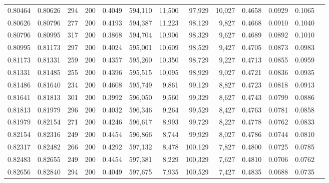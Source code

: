 \begin{tabular}{rrrrrrrrrrrrr}
0.80464 & 0.80626 &   294 & 200 &                                     0.4049 & 594,110 &  11,500 &  97,929 &  10,027 & 0.4658 & 0.0929 & 0.1065 \\
0.80626 & 0.80796 &   277 & 200 &                                     0.4193 & 594,387 &  11,223 &  98,129 &   9,827 & 0.4668 & 0.0910 & 0.1040 \\
0.80796 & 0.80995 &   317 & 200 &                                     0.3868 & 594,704 &  10,906 &  98,329 &   9,627 & 0.4689 & 0.0892 & 0.1010 \\
0.80995 & 0.81173 &   297 & 200 &                                     0.4024 & 595,001 &  10,609 &  98,529 &   9,427 & 0.4705 & 0.0873 & 0.0983 \\
0.81173 & 0.81331 &   259 & 200 &                                     0.4357 & 595,260 &  10,350 &  98,729 &   9,227 & 0.4713 & 0.0855 & 0.0959 \\
0.81331 & 0.81485 &   255 & 200 &                                     0.4396 & 595,515 &  10,095 &  98,929 &   9,027 & 0.4721 & 0.0836 & 0.0935 \\
0.81486 & 0.81640 &   234 & 200 &                                     0.4608 & 595,749 &   9,861 &  99,129 &   8,827 & 0.4723 & 0.0818 & 0.0913 \\
0.81641 & 0.81813 &   301 & 200 &                                     0.3992 & 596,050 &   9,560 &  99,329 &   8,627 & 0.4743 & 0.0799 & 0.0886 \\
0.81813 & 0.81979 &   296 & 200 &                                     0.4032 & 596,346 &   9,264 &  99,529 &   8,427 & 0.4763 & 0.0781 & 0.0858 \\
0.81979 & 0.82154 &   271 & 200 &                                     0.4246 & 596,617 &   8,993 &  99,729 &   8,227 & 0.4778 & 0.0762 & 0.0833 \\
0.82154 & 0.82316 &   249 & 200 &                                     0.4454 & 596,866 &   8,744 &  99,929 &   8,027 & 0.4786 & 0.0744 & 0.0810 \\
0.82317 & 0.82482 &   266 & 200 &                                     0.4292 & 597,132 &   8,478 & 100,129 &   7,827 & 0.4800 & 0.0725 & 0.0785 \\
0.82483 & 0.82655 &   249 & 200 &                                     0.4454 & 597,381 &   8,229 & 100,329 &   7,627 & 0.4810 & 0.0706 & 0.0762 \\
0.82656 & 0.82840 &   294 & 200 &                                     0.4049 & 597,675 &   7,935 & 100,529 &   7,427 & 0.4835 & 0.0688 & 0.0735 \\

\end{tabular}
